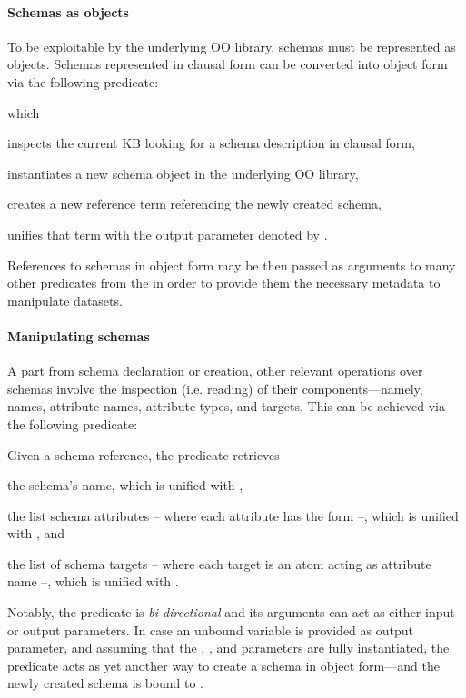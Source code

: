 \documentclass[12pt,a4paper,openright,twoside]{book}
\begin{document}
\paragraph{Schemas as objects}

To be exploitable by the underlying OO library, schemas must be represented as objects.
%
Schemas represented in clausal form can be converted into object form via the following predicate:
%
\begin{center}
\end{center}
%
which
%
\begin{inlinelist}
    \item inspects the current KB looking for a schema description in clausal form,
    \item instantiates a new schema object in the underlying OO library,
    \item creates a new reference term referencing the newly created schema,
    \item unifies that term with the output parameter denoted by .
\end{inlinelist}

References to schemas in object form may be then passed as arguments to many other predicates from the \mllib{} in order to provide them the necessary metadata to manipulate datasets.

\paragraph{Manipulating schemas}

A part from schema declaration or creation, other relevant operations over schemas involve the inspection (i.e. reading) of their components---namely, names, attribute names, attribute types, and targets.
%
This can be achieved via the following predicate:
%
\begin{center}
\end{center}
%
Given a schema reference, the predicate retrieves
%
\begin{inlinelist}
    \item the schema's name, which is unified with ,
    \item the list schema attributes -- where each attribute has the form  --, which is unified with , and
    \item the list of schema targets -- where each target is an atom acting as attribute name --, which is unified with .
\end{inlinelist}
%
Notably, the predicate is \emph{bi-directional} and its arguments can act as either input or output parameters.
%
In case an unbound  variable is provided as output parameter, and assuming that the , , and  parameters are fully instantiated, the  predicate acts as yet another way to create a schema in object form---and the newly created schema is bound to .
\end{document}
